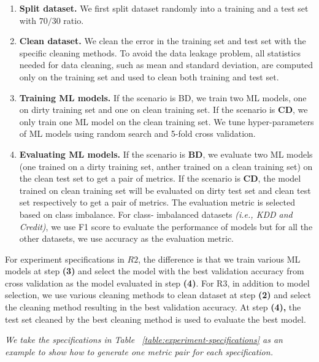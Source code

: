 \begin{enumerate}
	\item {
		\textbf{Split dataset.} We first split dataset randomly into a training
		and a test set with  $70/30$ ratio.
	}
	\item {
		\textbf{Clean dataset.} We clean the error in the training set and test
		set with the specific cleaning methods. To avoid the data
		leakage problem, all statistics needed for data cleaning, such
		as mean and standard deviation, are computed only on the
		training set and used to clean both training and test set.
    }
	\item {
		\textbf{Training ML models.} If the scenario is BD, we train two ML
		models, one on dirty training set and one on clean training
		set. If the scenario is \textbf{CD}, we only train one ML model on the
		clean training set. We tune hyper-parameters of ML models
		using random search and 5-fold cross validation.
	}
	\item {
		\textbf{Evaluating ML models.} If the scenario is \textbf{BD}, we evaluate
		two ML models (one trained on a dirty training set, anther
		trained on a clean training set) on the clean test set to get
		a pair of metrics. If the scenario is \textbf{CD}, the model trained
		on clean training set will be evaluated on dirty test set and
		clean test set respectively to get a pair of metrics. The evaluation metric is selected based on class imbalance. For class-
		imbalanced datasets \textit{(i.e., KDD and Credit)}, we use F1 score
		to evaluate the performance of models but for all the other
		datasets, we use accuracy as the evaluation metric.
	}
\end{enumerate}

For experiment specifications in $R2$, the difference is that we
train various ML models at step \textbf{(3)} and select the model with the
best validation accuracy from cross validation as the model evaluated in step \textbf{(4)}. 
For R3, in addition to model selection, we use
various cleaning methods to clean dataset at step \textbf{(2)} and select the cleaning method resulting in the best validation accuracy. At step
\textbf{(4),} the test set cleaned by the best cleaning method is used to evaluate the best model.


\begin{example}
\textit{We take the specifications in Table ~\ref{table:experiment-specifications} as an example to show how to generate one metric pair for each specification.}
\end{example}


